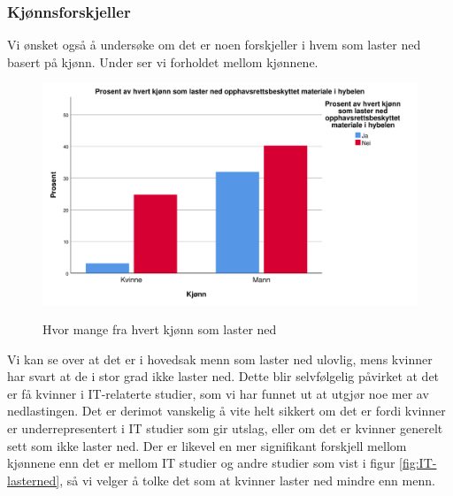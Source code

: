 \subsubsection{Kjønnsforskjeller}
Vi ønsket også å undersøke om det er noen forskjeller i hvem som laster ned basert på kjønn. Under ser vi forholdet mellom kjønnene.
\begin{figure}[H]
    \centering
    \includegraphics[scale=0.45]{case_1/bilder/kjonn_lasterned.pdf}
    \label{fig:kjønn_lasterned}
    \caption[Kjønn laster ned]{Hvor mange fra hvert kjønn som laster ned}
\end{figure}
Vi kan se over at det er i hovedsak menn som laster ned ulovlig, mens kvinner har svart at de i stor grad ikke laster ned. Dette blir selvfølgelig påvirket at det er få kvinner i IT-relaterte studier, som vi har funnet ut at utgjør noe mer av nedlastingen. Det er derimot vanskelig å vite helt sikkert om det er fordi kvinner er underrepresentert i IT studier som gir utslag, eller om det er kvinner generelt sett som ikke laster ned. Der er likevel en mer signifikant forskjell mellom kjønnene enn det er mellom IT studier og andre studier som vist i figur \ref{fig:IT-lasterned}, så vi velger å tolke det som at kvinner laster ned mindre enn menn.



